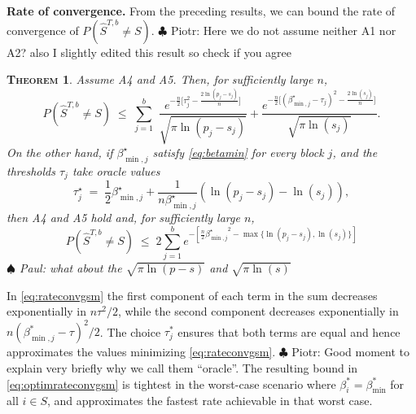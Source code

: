 \documentclass[aos]{imsart}
\theoremstyle{plain}
\newtheorem{thm}{\textsc{Theorem}}[section]
\newcommand{\piotr}[1]{{\small{\color{red} \sf $\clubsuit$ Piotr: #1}}}
\newcommand{\paul}[1]{{\small{\color{green} \sf $\spadesuit$ Paul: #1}}}
\newcommand{\bs}{\boldsymbol}
\begin{document}
\noindent\textbf{Rate of convergence.} From the %
preceding results, we can bound the rate of convergence of $P(\hat S^{T, b}\neq S)$.\piotr{Here we do not assume neither A1 nor A2? also I slightly edited this result so check if you agree} %
\begin{thm}\label{theo:fullrecovGS}
Assume A4 and A5. Then, for sufficiently large $n$,
\begin{equation} \label{eq:rateconvgsm}
P(\hat{S}^{T,b} \neq S)\;\leq\;\sum_{j=1}^b\,\,\frac{e^{-\tfrac{n}{2}\big[\tau_j^2-\tfrac{2\ln(p_j-s_j)}{n}\big]}}{\sqrt{\pi\ln(p_j-s_j)}}+\frac{e^{-\tfrac{n}{2}\big[(\beta^\star_{\min,j}-\tau_j)^2-\tfrac{2\ln(s_j)}{n}\big]}}{\sqrt{\pi\ln(s_j)}}.
\end{equation}
On the other hand, if $\beta^\star_{\min,j}$ satisfy \eqref{eq:betamin} for every block $j$, and the thresholds $\tau_j$ take oracle values
	\begin{equation} \label{eq:optimtauj}
\tau^\star_j \;=\; \frac{1}{2}\beta^\star_{\min,j}+\frac{1}{n\beta^\star_{\min,j}}(\ln({p_j-s_j})-\ln({s_j})),
\end{equation}
then A4 and A5 hold and, for sufficiently large $n$, %
\begin{equation}\label{eq:optimrateconvgsm}
    P(\hat{S}^{T,b} \neq S) \; \leq \; 2 \sum_{j=1}^be^{-[\frac{n}{2}{\beta^\star_{\min,j}}^2-\max\{\ln(p_j-s_j),\ln(s_j)\}]}
\end{equation}
\paul{what about the $\sqrt{\pi\ln(p-s)}$ and $\sqrt{\pi\ln(s)}$}
\end{thm}
In \eqref{eq:rateconvgsm} the first component of each term in the sum decreases exponentially in $n\tau^2/2$, while the second component decreases exponentially in $n(\beta_{\min,j}^*-\tau)^2/2$. The choice $\tau^*_j$ ensures that both terms are equal and hence approximates the values minimizing \eqref{eq:rateconvgsm}.  \piotr{Good moment to explain very briefly why we call them ``oracle''.} 
The resulting bound in \eqref{eq:optimrateconvgsm} is tightest in the worst-case scenario where $\beta_i^*=\beta_{\min}^*$ for all $i \in S$, and approximates the fastest rate achievable in that worst case.
\end{document}
